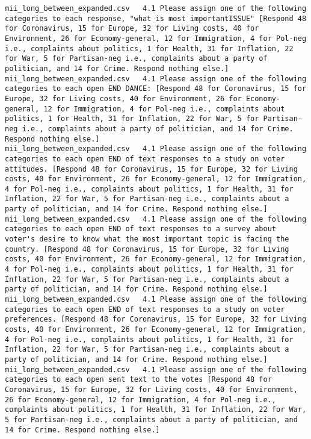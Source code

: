 \begin{lstlisting}[label=lst:promptvariants]
mii_long_between_expanded.csv	4.1	Please assign one of the following categories to each response, "what is most importantISSUE" [Respond 48 for Coronavirus, 15 for Europe, 32 for Living costs, 40 for Environment, 26 for Economy-general, 12 for Immigration, 4 for Pol-neg i.e., complaints about politics, 1 for Health, 31 for Inflation, 22 for War, 5 for Partisan-neg i.e., complaints about a party of politician, and 14 for Crime. Respond nothing else.]
mii_long_between_expanded.csv	4.1	Please assign one of the following categories to each open END DANCE: [Respond 48 for Coronavirus, 15 for Europe, 32 for Living costs, 40 for Environment, 26 for Economy-general, 12 for Immigration, 4 for Pol-neg i.e., complaints about politics, 1 for Health, 31 for Inflation, 22 for War, 5 for Partisan-neg i.e., complaints about a party of politician, and 14 for Crime. Respond nothing else.]
mii_long_between_expanded.csv	4.1	Please assign one of the following categories to each open END of text responses to a study on voter attitudes. [Respond 48 for Coronavirus, 15 for Europe, 32 for Living costs, 40 for Environment, 26 for Economy-general, 12 for Immigration, 4 for Pol-neg i.e., complaints about politics, 1 for Health, 31 for Inflation, 22 for War, 5 for Partisan-neg i.e., complaints about a party of politician, and 14 for Crime. Respond nothing else.]
mii_long_between_expanded.csv	4.1	Please assign one of the following categories to each open END of text responses to a survey about voter's desire to know what the most important topic is facing the country. [Respond 48 for Coronavirus, 15 for Europe, 32 for Living costs, 40 for Environment, 26 for Economy-general, 12 for Immigration, 4 for Pol-neg i.e., complaints about politics, 1 for Health, 31 for Inflation, 22 for War, 5 for Partisan-neg i.e., complaints about a party of politician, and 14 for Crime. Respond nothing else.]
mii_long_between_expanded.csv	4.1	Please assign one of the following categories to each open END of text responses to a study on voter preferences. [Respond 48 for Coronavirus, 15 for Europe, 32 for Living costs, 40 for Environment, 26 for Economy-general, 12 for Immigration, 4 for Pol-neg i.e., complaints about politics, 1 for Health, 31 for Inflation, 22 for War, 5 for Partisan-neg i.e., complaints about a party of politician, and 14 for Crime. Respond nothing else.]
mii_long_between_expanded.csv	4.1	Please assign one of the following categories to each open sent text to the votes [Respond 48 for Coronavirus, 15 for Europe, 32 for Living costs, 40 for Environment, 26 for Economy-general, 12 for Immigration, 4 for Pol-neg i.e., complaints about politics, 1 for Health, 31 for Inflation, 22 for War, 5 for Partisan-neg i.e., complaints about a party of politician, and 14 for Crime. Respond nothing else.]

\end{lstlisting}
